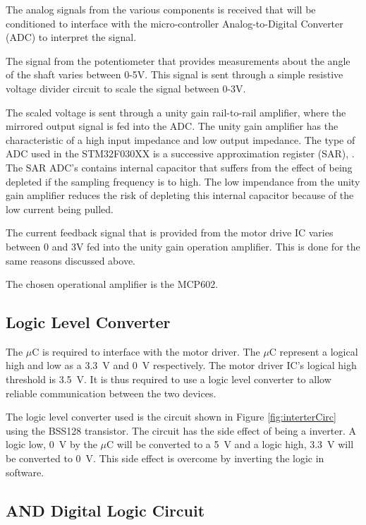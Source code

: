 The analog signals from the various components is received that will be conditioned to interface with the micro-controller Analog-to-Digital Converter (ADC) to interpret the signal.

The signal from the potentiometer that provides measurements about the angle of the shaft varies between 0-5V. This signal is sent through a simple resistive voltage divider circuit to scale the signal between 0-3V. 

The scaled voltage is sent through a unity gain rail-to-rail amplifier, where the mirrored output signal is fed into the ADC. The unity gain amplifier has the characteristic of a high input impedance and low output impedance. The type of ADC used in the STM32F030XX is a successive approximation register (SAR), \cite{stm32_ADC:2017}. The SAR ADC's contains internal capacitor that suffers from the effect of being depleted if the sampling frequency is to high. The low impendance from the unity gain amplifier reduces the risk of depleting this internal capacitor because of the low current being pulled.

The current feedback signal that is provided from the motor drive IC varies between 0 and 3V fed into the unity gain operation amplifier. This is done for the same reasons discussed above.

The chosen operational amplifier is the MCP602. 

\subsection{Logic Level Converter}

The $\mu$C is required to interface with the motor driver. The $\mu$C represent a logical high and low as a \SI{3.3}{V} and \SI{0}{V} respectively. The motor driver IC's logical high threshold is \SI{3.5}{V}. It is thus required to use a logic level converter to allow reliable communication between the two devices.

The logic level converter used is the circuit shown in Figure \ref{fig:interterCirc} using the BSS128 transistor. The circuit has the side effect of being a inverter. A logic low, \SI{0}{V} by the $\mu$C will be converted to a \SI{5}{V} and a logic high, \SI{3.3}{V} will be converted to \SI{0}{V}. This side effect is overcome by inverting the logic in software.

\subsection{AND Digital Logic Circuit}

